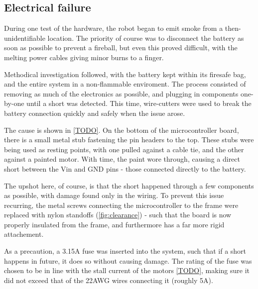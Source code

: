 \documentclass[main.tex]{subfiles}
\begin{document}
\subsection{Electrical failure}

During one test of the hardware, the robot began to emit smoke from a then-unidentifiable location. The priority of course was to disconnect the battery as soon as possible to prevent a fireball, but even this proved difficult, with the melting power cables giving minor burns to a finger.

Methodical investigation followed, with the battery kept within its firesafe bag, and the entire system in a non-flammable enviroment. The process consisted of removing as much of the electronics as possible, and plugging in components one-by-one until a short was detected. This time, wire-cutters were used to break the battery connection quickly and safely when the issue arose.

The cause is shown in \cref{TODO}. On the bottom of the microcontroller board, there is a small metal stub fastening the pin headers to the top. These stubs were being used as resting points, with one pulled against a cable tie, and the other against a painted motor. With time, the paint wore through, causing a direct short between the Vin and GND pins - those connected directly to the battery.

The upshot here, of course, is that the short happened through a few components as possible, with damage found only in the wiring. To prevent this issue recurring, the metal screws connecting the microcontroller to the frame were replaced with nylon standoffs (\cref{fig:clearance}) - such that the board is now properly insulated from the frame, and furthermore has a far more rigid attachement.

As a precaution, a 3.15A fuse was inserted into the system, such that if a short happens in future, it does so without causing damage. The rating of the fuse was chosen to be in line with the stall current of the motors \ref{TODO}, making sure it did not exceed that of the 22AWG wires connecting it (roughly 5A).




\bib
\end{document}
